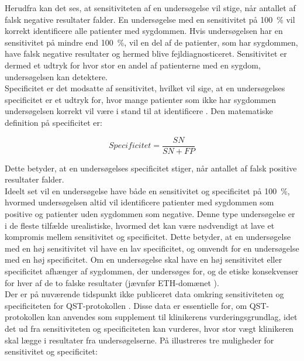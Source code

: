 Herudfra kan det ses, at sensitiviteten af en undersøgelse vil stige, når antallet af falsk negative resultater falder. En undersøgelse med en sensitivitet på 100~\% vil korrekt identificere alle patienter med sygdommen. Hvis undersøgelsen har en sensitivitet på mindre end 100~\%, vil en del af de patienter, som har sygdommen, have falsk negative resultater og hermed blive fejldiagnosticeret. Sensitivitet er dermed et udtryk for hvor stor en andel af patienterne med en sygdom, undersøgelsen kan detektere. \citep{Lalkhen2008} \\
Specificitet er det modsatte af sensitivitet, hvilket vil sige, at en undersøgelses specificitet er et udtryk for, hvor mange patienter som ikke har sygdommen undersøgelsen korrekt vil være i stand til at identificere \citep{Lalkhen2008}. Den matematiske definition på specificitet er:
\vspace{-0.50cm}
\begin{center}
	\begin{equation}
	Specificitet=\frac{SN}{SN+FP}
	\end{equation}
\end{center}

Dette betyder, at en undersøgelses specificitet stiger, når antallet af falsk positive resultater falder. \citep{Lalkhen2008} \\
Ideelt set vil en undersøgelse have både en sensitivitet og specificitet på 100~\%, hvormed undersøgelsen altid vil identificere patienter med sygdommen som positive og patienter uden sygdommen som negative. Denne type undersøgelse er i de fleste tilfælde urealistiske, hvormed det kan være nødvendigt at lave et kompromis mellem sensitivitet og specificitet. Dette betyder, at en undersøgelse med en høj sensitivitet vil have en lav specificitet, og omvendt for en undersøgelse med en høj specificitet. Om en undersøgelse skal have en høj sensitivitet eller specificitet afhænger af sygdommen, der undersøges for, og de etiske konsekvenser for hver af de to falske resultater (jævnfør ETH-domænet ). \\
Der er på nuværende tidspunkt ikke publiceret data omkring sensitiviteten og specificiteten for QST-protokollen \citep{Wylde2013}. Disse data er essentielle for, om QST-protokollen kan anvendes som supplement til klinikerens vurderingsgrundlag, idet det ud fra sensitiviteten og specificiteten kan vurderes, hvor stor vægt klinikeren skal lægge i resultater fra undersøgelserne. På  illustreres tre muligheder for sensitivitet og specificitet:

